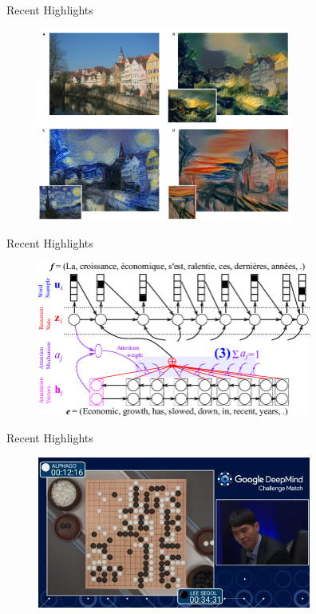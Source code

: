 \documentclass{beamer}
\begin{document}
\begin{frame}{Recent Highlights}
		\begin{figure}
	  		\vspace*{0.1cm}
			\centering
			\includegraphics[trim = 0mm 0mm 0mm 0mm, clip, width=8.4cm]{style.PNG}
			\label{fig:res4}
		\end{figure}
\end{frame}

\begin{frame}{Recent Highlights}
		\begin{figure}
	  		\vspace*{0.1cm}
			\centering
			\includegraphics[trim = 0mm 0mm 0mm 0mm, clip, width=9.0cm]{machinetranslation.png}
			\label{fig:res4}
		\end{figure}
\end{frame}

\begin{frame}{Recent Highlights}
		\begin{figure}
	  		\vspace*{0.1cm}
			\centering
			\includegraphics[trim = 0mm 0mm 0mm 0mm, clip, width=9.0cm]{alphago.jpg}
			\label{fig:res4}
		\end{figure}
\end{frame}
\end{document}
